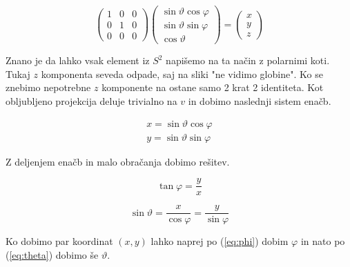 \documentclass{article}
\begin{document}
\begin{equation}
	\begin{pmatrix}
		1 & 0 & 0 \\
		0 & 1 & 0 \\
		0 & 0 & 0
	\end{pmatrix}
	\begin{pmatrix}
		\sin \vartheta \cos \varphi \\
		\sin \vartheta \sin \varphi \\
		\cos \vartheta
	\end{pmatrix}
	=
	\begin{pmatrix}
		x \\
		y \\
		z	
	\end{pmatrix}
	\label{eq:projector_components}
\end{equation}

Znano je da lahko vsak element iz $S^2$ napišemo na ta način z polarnimi koti. 
Tukaj $z$ komponenta seveda odpade, saj na sliki "ne vidimo globine". Ko se znebimo nepotrebne $z$ komponente
na ostane samo 2 krat 2 identiteta. Kot obljubljeno projekcija deluje trivialno na $v$ in
dobimo naslednji sistem enačb.

\begin{equation}
	\begin{aligned}
		x = \sin \vartheta \cos \varphi \\
		y = \sin \vartheta \sin \varphi 
	\end{aligned}
	\label{eq:system_of_equations}
\end{equation}

\newpage

Z deljenjem enačb in malo obračanja dobimo rešitev.

\begin{equation}
	\tan \varphi = \frac{y}{x}
	\label{eq:phi}
\end{equation}

\begin{equation}
	\sin \vartheta = \frac{x}{\cos \varphi} = \frac{y}{\sin \varphi}
	\label{eq:theta}
\end{equation}

Ko dobimo par koordinat $(x,y)$ lahko naprej po (\ref{eq:phi}) dobim $\varphi$ in nato po (\ref{eq:theta}) dobimo
še $\vartheta$.
\end{document}
